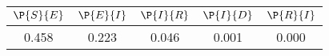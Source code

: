 \begin{tabular}{ccccc}
\hline
$\P{S}{E}$&$\P{E}{I}$&$\P{I}{R}$&$\P{I}{D}$&$\P{R}{I}$\\
\hline
0.458&0.223&0.046&0.001&0.000\\
\hline
\end{tabular}